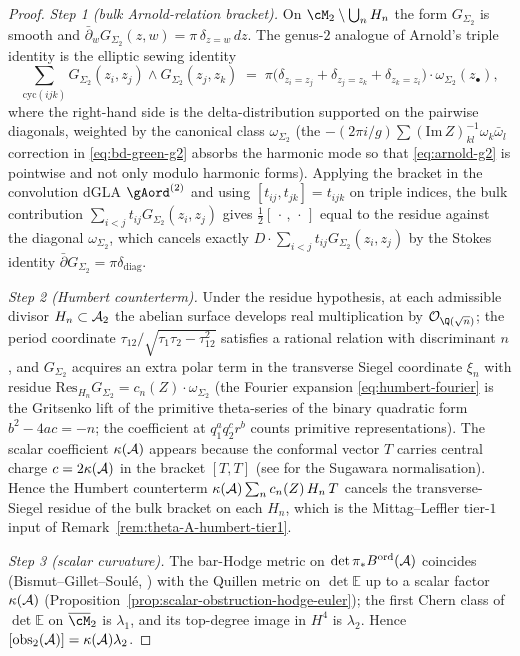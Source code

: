 \begin{proof}
\emph{Step 1 (bulk Arnold-relation bracket).} On
$\cM_2\setminus\bigcup_n H_n$ the form $G_{\Sigma_2}$ is smooth and
$\bar\partial_w G_{\Sigma_2}(z,w)=\pi\,\delta_{z=w}\,dz$. The
genus-$2$ analogue of Arnold's triple identity is the elliptic
sewing identity \cite[Prop.~2.4]{Enriquez2008}
\begin{equation}\label{eq:arnold-g2}
\sum_{\mathrm{cyc}(ijk)}
G_{\Sigma_2}(z_i,z_j)\wedge G_{\Sigma_2}(z_j,z_k)
\;=\;
\pi\bigl(\delta_{z_i=z_j}+\delta_{z_j=z_k}+\delta_{z_k=z_i}\bigr)
\cdot\omega_{\Sigma_2}(z_\bullet),
\end{equation}
where the right-hand side is the delta-distribution supported on the
pairwise diagonals, weighted by the canonical class
$\omega_{\Sigma_2}$ \textup{(}the
$-(2\pi i/g)\sum(\mathrm{Im}\,Z)^{-1}_{kl}\omega_k\bar\omega_l$
correction in \eqref{eq:bd-green-g2} absorbs the harmonic mode so
that \eqref{eq:arnold-g2} is pointwise and not only modulo harmonic
forms\textup{)}. Applying the bracket in the convolution dGLA
${\gAord}^{(2)}$ and using $[t_{ij},t_{jk}]=t_{ijk}$ on triple
indices, the bulk contribution
$\sum_{i<j}t_{ij}G_{\Sigma_2}(z_i,z_j)$ gives
$\tfrac12[\,\cdot\,,\,\cdot\,]$ equal to the residue against the
diagonal $\omega_{\Sigma_2}$, which cancels exactly
$D\cdot\sum_{i<j}t_{ij}G_{\Sigma_2}(z_i,z_j)$ by the Stokes identity
$\bar\partial G_{\Sigma_2}=\pi\delta_{\mathrm{diag}}$.

\emph{Step 2 (Humbert counterterm).} Under the residue hypothesis, at
each admissible divisor
$H_n\subset\mathcal{A}_2$ the abelian surface develops real multiplication
by $\mathcal{O}_{\Q(\sqrt{n})}$; the period coordinate
$\tau_{12}/\sqrt{\tau_1\tau_2-\tau_{12}^2}$ satisfies a rational
relation with discriminant $n$, and
$G_{\Sigma_2}$ acquires an extra polar term in the transverse
Siegel coordinate $\xi_n$ with residue
$\mathrm{Res}_{H_n}G_{\Sigma_2}=c_n(Z)\cdot\omega_{\Sigma_2}$
\textup{(}the Fourier expansion \eqref{eq:humbert-fourier} is the
Gritsenko lift of the primitive theta-series of the binary
quadratic form $b^2-4ac=-n$; the coefficient at $q_1^a q_2^c r^b$
counts primitive representations\textup{)}. The scalar coefficient
$\kappa(\mathcal{A})$ appears because the conformal vector $T$ carries
central charge $c=2\kappa(\mathcal{A})$ in the bracket $[T,T]$ \textup{(}see
\cite{KW88} for the Sugawara normalisation\textup{)}.
Hence the Humbert counterterm $\kappa(\mathcal{A})\sum_n c_n(Z)\,H_n\,T$
cancels the transverse-Siegel residue of the bulk bracket on each
$H_n$, which is the Mittag--Leffler tier-$1$ input of
Remark~\ref{rem:theta-A-humbert-tier1}.

\emph{Step 3 (scalar curvature).} The bar-Hodge metric on
$\det\pi_*B^{\mathrm{ord}}(\mathcal{A})$ coincides \textup{(}Bismut--Gillet--Soul\'e,
\cite[Thm.~0.1]{BGS1988}\textup{)} with the Quillen metric on
$\det\mathbb{E}$ up to a scalar factor $\kappa(\mathcal{A})$
\textup{(}Proposition~\ref{prop:scalar-obstruction-hodge-euler}\textup{)};
the first Chern class of $\det\mathbb{E}$ on $\overline{\cM}_2$ is
$\lambda_1$, and its top-degree image in $H^4$ is $\lambda_2$. Hence
$[\mathrm{obs}_2(\mathcal{A})]=\kappa(\mathcal{A})\lambda_2$.
\end{proof}

